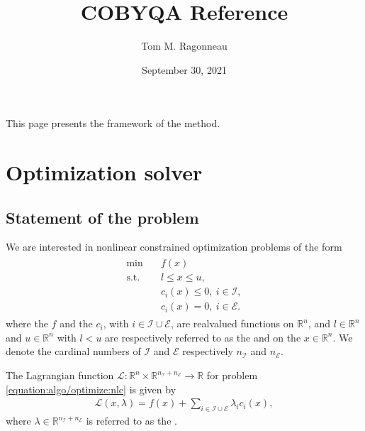 \documentclass[letterpaper,10pt,english]{sphinxmanual}
\title{COBYQA Reference}
\date{September 30, 2021}
\author{Tom M. Ragonneau}
\def\R{\ensuremath{\mathds{R}}}
\newcommand{\dv}{x}
\newcommand{\icon}{i}
\newcommand{\lmv}{\lambda}
\newcommand{\nv}{n}
\newcommand{\bl}{l}
\newcommand{\bu}{u}
\newcommand{\con}[1][\icon]{c_{#1}}
\newcommand{\lag}{\mathcal{L}}
\newcommand{\meq}{n_{\scriptscriptstyle\seq}}
\newcommand{\mub}{n_{\scriptscriptstyle\sub}}
\newcommand{\obj}{f}
\newcommand{\seq}{\mathcal{E}}
\newcommand{\sub}{\mathcal{I}}
\begin{document}
\pagestyle{empty}
\sphinxmaketitle
\pagestyle{plain}
\sphinxtableofcontents
\pagestyle{normal}
\label{\detokenize{algo/index::doc}}


\sphinxAtStartPar
This page presents the framework of the method.


\chapter{Optimization solver}
\label{\detokenize{algo/optimize:optimization-solver}}\label{\detokenize{algo/optimize:optimize}}\label{\detokenize{algo/optimize::doc}}

\section{Statement of the problem}
\label{\detokenize{algo/optimize:statement-of-the-problem}}
\sphinxAtStartPar
We are interested in nonlinear constrained optimization problems of the form
\begin{equation}\label{equation:algo/optimize:nlc}
\begin{split}\begin{array}{ll}
    \min        & \quad \obj(\dv)\\
    \text{s.t.} & \quad \bl \le \dv \le \bu,\\
                & \quad \con(\dv) \le 0, ~ \icon \in \sub,\\
                & \quad \con(\dv) = 0, ~ \icon \in \seq.
\end{array}\end{split}
\end{equation}
\sphinxAtStartPar
where the  \(\obj\) and the 
\(\con\), with \(\icon \in \sub \cup \seq\), are real\sphinxhyphen{}valued functions
on \(\R^{\nv}\), and \(\bl \in \R^{\nv}\) and \(\bu \in \R^{\nv}\)
with \(\bl < \bu\) are respectively referred to as the  and
 on the  \(\dv \in \R^{\nv}\).
We denote the cardinal numbers of \(\sub\) and \(\seq\) respectively
\(\mub\) and \(\meq\).

\sphinxAtStartPar
The Lagrangian function \(\lag \colon \R^n \times \R^{\mub + \meq} \to \R\)
for problem \eqref{equation:algo/optimize:nlc} is given by
\begin{equation}\label{equation:algo/optimize:lag}
\begin{split}\lag(\dv, \lmv) = \obj(\dv) + \sum_{\icon \in \sub \cup \seq} \lmv_{\icon}
\con(\dv),\end{split}
\end{equation}
\sphinxAtStartPar
where \(\lmv \in \R^{\mub + \meq}\) is referred to as the .
\end{document}

